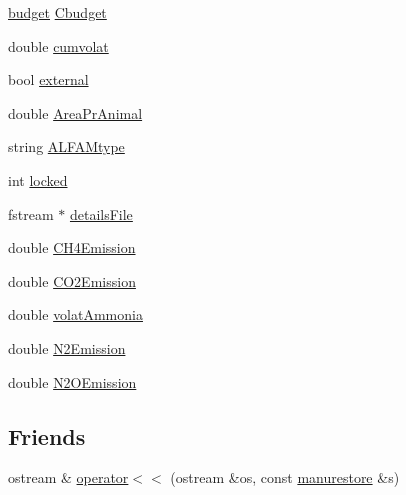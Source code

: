\begin{DoxyCompactItemize}
\item 
\hyperlink{classbudget}{budget} \hyperlink{classmanurestore_a9bb652a6ec6a71e7bfcdb8a0cf73272b}{Cbudget}
\item 
double \hyperlink{classmanurestore_a83dff87ec3a864c3534ef4dd9103dd47}{cumvolat}
\item 
bool \hyperlink{classmanurestore_a9fc691bdb73d03bccf6ac813990670a1}{external}
\item 
double \hyperlink{classmanurestore_a56e78af8ef392eb99640c2c33812052d}{AreaPrAnimal}
\item 
string \hyperlink{classmanurestore_ad8a98a02aa12b2e52d5d7a78f27cc5e6}{ALFAMtype}
\item 
int \hyperlink{classmanurestore_ac61951ff08b90b86360c5719079944b1}{locked}
\item 
fstream $\ast$ \hyperlink{classmanurestore_a05652f923c77a13d673da07a22b3175e}{detailsFile}
\item 
double \hyperlink{classmanurestore_ae472072caaaea49932fe2152e6a4fb09}{CH4Emission}
\item 
double \hyperlink{classmanurestore_aebc6ae97114292e973c57cbc2ecc4f84}{CO2Emission}
\item 
double \hyperlink{classmanurestore_ac9d398e432684fb02bfaf52c2f0e9ae8}{volatAmmonia}
\item 
double \hyperlink{classmanurestore_a9a8d525f55145b43f2ab275fb9b5f35f}{N2Emission}
\item 
double \hyperlink{classmanurestore_aca5ad359219f1f6c9a957f03156136ab}{N2OEmission}
\end{DoxyCompactItemize}
\subsection*{Friends}
\begin{DoxyCompactItemize}
\item 
ostream \& \hyperlink{classmanurestore_a8ac9597914271cef193878847c073724}{operator$<$$<$} (ostream \&os, const \hyperlink{classmanurestore}{manurestore} \&s)
\end{DoxyCompactItemize}


